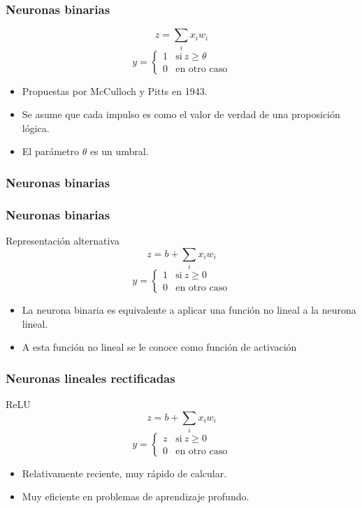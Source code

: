 \message{ !name(intro_rn.tex)}\documentclass{beamer}
\begin{document}
\begin{frame}
  \frametitle{Neuronas binarias}
  \begin{block}{}
      $$ z = \sum_{i} x_i w_i $$
      $$ y = \left\{
          \begin{array}{ll}
            1 & \text{si}\ z \ge \theta \\
            0 & \text{en otro caso}
          \end{array} \right. $$
  \end{block}

  \begin{itemize}
  \item Propuestas por McCulloch y Pitts en 1943.
  \item Se asume que cada impulso es como el valor de verdad de una
    proposición lógica.
  \item El parámetro $\theta$ es un umbral.
  \end{itemize}
\end{frame}

\begin{frame}
  \frametitle{Neuronas binarias}

  \frametitle{Neuronas binarias}
  \begin{block}{Representación alternativa}
      $$ z = b + \sum_{i} x_i w_i $$
      $$ y = \left\{
          \begin{array}{ll}
            1 & \text{si}\ z \ge 0 \\
            0 & \text{en otro caso}
          \end{array} \right. $$
  \end{block}

  \begin{itemize}
  \item La neurona binaria es equivalente a aplicar una función no
    lineal a la neurona lineal.
  \item A esta función no lineal se le conoce como \alert{función de activación}
  \end{itemize}
\end{frame}

\begin{frame}
 \frametitle{Neuronas lineales rectificadas}
  \begin{block}{ReLU}
      $$ z = b + \sum_{i} x_i w_i $$
      $$ y = \left\{
          \begin{array}{ll}
            z & \text{si}\ z \ge 0 \\
            0 & \text{en otro caso}
          \end{array} \right. $$
  \end{block}
  
  \begin{itemize}
  \item Relativamente reciente, muy rápido de calcular.
  \item Muy eficiente en problemas de aprendizaje profundo.
  \end{itemize}
\end{frame}
\end{document}
